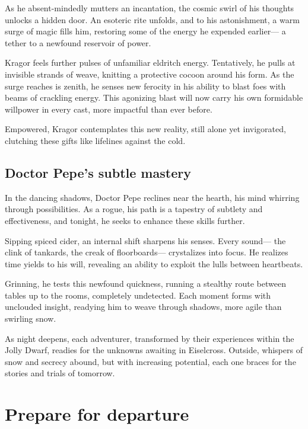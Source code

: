 \documentclass[
  letterpaper,12pt,twoside,twocolumn,openany,
  nodeprecatedcode,bg=full]{dndbook}
\begin{document}
As he absent-mindedly mutters an incantation, the cosmic swirl of his
thoughts unlocks a hidden door. An esoteric rite unfolds, and to his
astonishment, a warm surge of magic fills him, restoring some of the
energy he expended earlier--- a tether to a newfound reservoir of power.

Kragor feels further pulses of unfamiliar eldritch energy. Tentatively,
he pulls at invisible strands of weave, knitting a protective cocoon
around his form. As the surge reaches is zenith, he senses new ferocity
in his ability to blast foes with beams of crackling energy. This
agonizing blast will now carry his own formidable willpower in every
cast, more impactful than ever before.

Empowered, Kragor contemplates this new reality, still alone yet
invigorated, clutching these gifts like lifelines against the cold.

\subsection{Doctor Pepe's subtle
mastery}\label{doctor-pepes-subtle-mastery}

In the dancing shadows, Doctor Pepe reclines near the hearth, his mind
whirring through possibilities. As a rogue, his path is a tapestry of
subtlety and effectiveness, and tonight, he seeks to enhance these
skills further.

Sipping spiced cider, an internal shift sharpens his senses. Every
sound--- the clink of tankards, the creak of floorboards--- crystalizes
into focus. He realizes time yields to his will, revealing an ability to
exploit the lulls between heartbeats.

Grinning, he tests this newfound quickness, running a stealthy route
between tables up to the rooms, completely undetected. Each moment forms
with unclouded insight, readying him to weave through shadows, more
agile than swirling snow.

As night deepens, each adventurer, transformed by their experiences
within the Jolly Dwarf, readies for the unknowns awaiting in Eiselcross.
Outside, whispers of snow and secrecy abound, but with increasing
potential, each one braces for the stories and trials of tomorrow.

\section{Prepare for departure}\label{prepare-for-departure}
\end{document}
